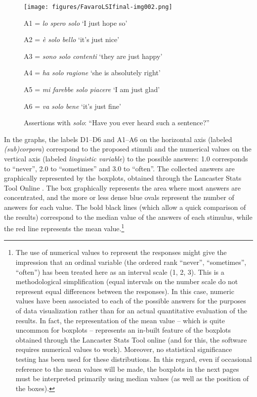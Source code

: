 \begin{figure}
\texttt{[image: figures/FavaroLSIfinal-img002.png]}


{\small\raggedright
A1 = \textit{lo spero solo} ‘I just hope so’

A2 = \textit{è solo bello} ‘it’s just nice’

A3 = \textit{sono solo contenti} ‘they are just happy’

A4 = \textit{ha solo ragione} ‘she is absolutely right’

A5 = \textit{mi farebbe solo piacere} ‘I am just glad’

A6 = \textit{va solo bene} ‘it’s just fine’\par}

\caption{\label{fig:key:8.2} Assertions with \textit{solo}: “Have you ever heard such a sentence?”}
\end{figure}

In the graphs, the labels D1–D6 and A1–A6 on the horizontal axis (labeled \textit{(sub)corpora}) correspond to the proposed stimuli and the numerical values on the vertical axis (labeled \textit{linguistic variable}) to the possible answers: 1.0 corresponds to “never”, 2.0 to “sometimes” and 3.0 to “often”. The collected answers are graphically represented by the boxplots, obtained through the Lancaster Stats Tool Online \citep{Brezina2018}. The box graphically represents the area where most answers are concentrated, and the more or less dense blue ovals represent the number of answers for each value. The bold black lines (which allow a quick comparison of the results) correspond to the median value of the answers of each stimulus, while the red line represents the mean value.\footnote{The use of numerical values to represent the responses might give the impression that an ordinal variable (the ordered rank “never”, “sometimes”, “often”) has been treated here as an interval scale (1, 2, 3). This is a methodological simplification (equal intervals on the number scale do not represent equal differences between the responses). In this case, numeric values have been associated to each of the possible answers for the purposes of data visualization rather than for an actual quantitative evaluation of the results. In fact, the representation of the mean value – which is quite uncommon for boxplots – represents an in-built feature of the boxplots obtained through the Lancaster Stats Tool online (and for this, the software requires numerical values to work). Moreover, no statistical significance testing has been used for these distributions. In this regard, even if occasional reference to the mean values will be made, the boxplots in the next pages must be interpreted primarily using median values (as well as the position of the boxes).}

